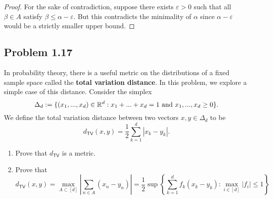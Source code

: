 \documentclass[12pt]{article}
\begin{document}
\begin{proof}
	For the sake of contradiction, suppose there exists $\varepsilon > 0$ such that all $\beta \in A$ satisfy $\beta \leq \alpha - \varepsilon$. But this contradicts the minimality of $\alpha$ since $\alpha - \varepsilon$ would be a strictly smaller upper bound. 
\end{proof}

\newpage 

\subsection{Problem 1.17}

\begin{problem}
	In probability theory, there is a useful metric on the distributions of a fixed sample space called the \textbf{total variation distance}. In this problem, we explore a simple case of this distance. Consider the simplex
        \[
            \Delta_d := \{(x_1, ..., x_d) \in \mathbb{R}^d : x_1 + ... + x_d = 1 \text{ and } x_1, ..., x_d \geq 0\}.
        \]
        We define the total variation distance between two vectors $x, y \in \Delta_d$ to be 
        \[
            d_{\mathsf{TV}} (x, y) = \frac{1}{2}  \sum_{k = 1}^d |x_k - y_k|.
        \]
        \begin{enumerate}[label = (\alph*)]
            \item Prove that $d_{\mathsf{TV}}$ is a metric.
            
            \item Prove that 
            \[
                d_{\mathsf{TV}}(x, y) = \max_{A \subset [d]} \left | \sum_{n \in A} (x_n - y_n) \right | = \frac{1}{2}\sup \left \{ \sum_{k = 1}^d f_k (x_k - y_k) : \max_{i \in [d]} |f_i| \leq 1 \right \}
            \] 
        \end{enumerate}
\end{problem}
\end{document}
